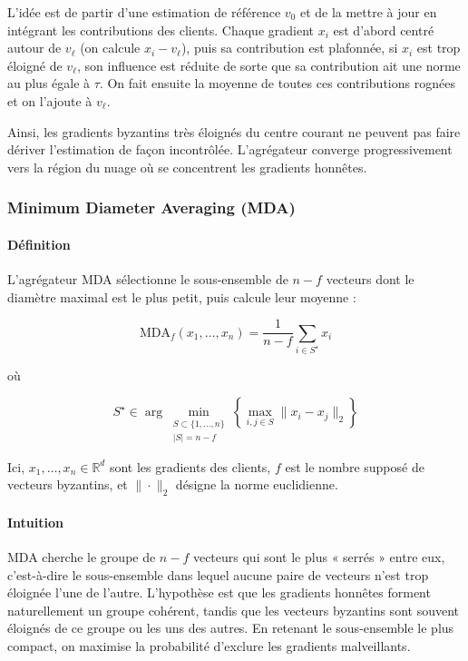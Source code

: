 \documentclass[a4paper,11pt]{article}
\begin{document}
L'idée est de partir d'une estimation de référence $v_0$ et de la mettre à jour en intégrant les contributions des clients. Chaque gradient $x_i$ est d'abord centré autour de $v_\ell$ (on calcule $x_i - v_\ell$), puis sa contribution est plafonnée, si $x_i$ est trop éloigné de $v_\ell$, son influence est réduite de sorte que sa contribution ait une norme au plus égale à $\tau$. On fait ensuite la moyenne de toutes ces contributions rognées et on l'ajoute à $v_\ell$.

Ainsi, les gradients byzantins très éloignés du centre courant ne peuvent pas faire dériver l'estimation de façon incontrôlée. L'agrégateur converge progressivement vers la région du nuage où se concentrent les gradients honnêtes.

\subsubsection{Minimum Diameter Averaging (MDA)}

\paragraph{Définition}

L'agrégateur MDA sélectionne le sous-ensemble de $n-f$ vecteurs dont le diamètre maximal est le plus petit, puis calcule leur moyenne :

\[
\mathrm{MDA}_f(x_1,\dots,x_n) = \frac{1}{n-f}\sum_{i \in S^\star} x_i
\]

où

\[
S^\star \in \arg\min_{\substack{S \subset \{1,\dots,n\} \\ |S|=n-f}} \left\{\max_{i,j \in S} \|x_i - x_j\|_2\right\}
\]

Ici, $x_1,\dots,x_n \in \mathbb{R}^d$ sont les gradients des clients, $f$ est le nombre supposé de vecteurs byzantins, et $\|\cdot\|_2$ désigne la norme euclidienne.

\paragraph{Intuition}

MDA cherche le groupe de $n-f$ vecteurs qui sont le plus « serrés » entre eux, c'est-à-dire le sous-ensemble dans lequel aucune paire de vecteurs n'est trop éloignée l'une de l'autre. L'hypothèse est que les gradients honnêtes forment naturellement un groupe cohérent, tandis que les vecteurs byzantins sont souvent éloignés de ce groupe ou les uns des autres. En retenant le sous-ensemble le plus compact, on maximise la probabilité d'exclure les gradients malveillants.
\end{document}

